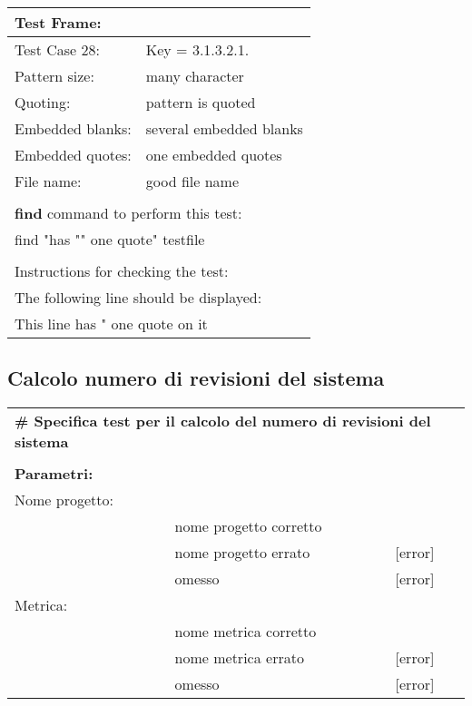 \vspace{1cm}

\begin{tabular}{ll}
\hline
\multicolumn{2}{l}{ \textbf{Test Frame:} }			\\
\hline
Test Case 28:		&	{Key = 3.1.3.2.1.}			\\
Pattern size:		&	many character				\\
Quoting:			&	pattern is quoted			\\
Embedded blanks:	&	several embedded blanks		\\
Embedded quotes:	&	one embedded quotes			\\
File name:			&	good file name				\\
\multicolumn{2}{l}{ }											\\
\multicolumn{2}{l}{ \textbf{find} command to perform this test: }		\\
\multicolumn{2}{l}{ find "has "" one quote" testfile }			\\
\multicolumn{2}{l}{ }											\\
\multicolumn{2}{l}{ Instructions for checking the test: }		\\
\multicolumn{2}{l}{ The following line should be displayed: }	\\
\multicolumn{2}{l}{ This line has " one quote on it }			\\
\hline
\end{tabular}

\clearpage

\subsection{Calcolo numero di revisioni del sistema}

\begin{tabular}{lp{6cm}l}
\multicolumn{3}{l}{ \textbf{\# Specifica test per il calcolo del numero di revisioni del sistema } }	\\
\multicolumn{3}{l}{ }																\\
\textbf{Parametri:}		& 										&					\\
Nome progetto:			&										&					\\
						&	nome progetto corretto				&					\\
						&	nome progetto errato				&	[error]			\\
						&	omesso								&	[error]			\\

Metrica:				&										&					\\
						&	nome metrica corretto				&					\\
						&	nome metrica errato					&	[error]			\\
						&	omesso								&	[error]			\\
\end{tabular}

